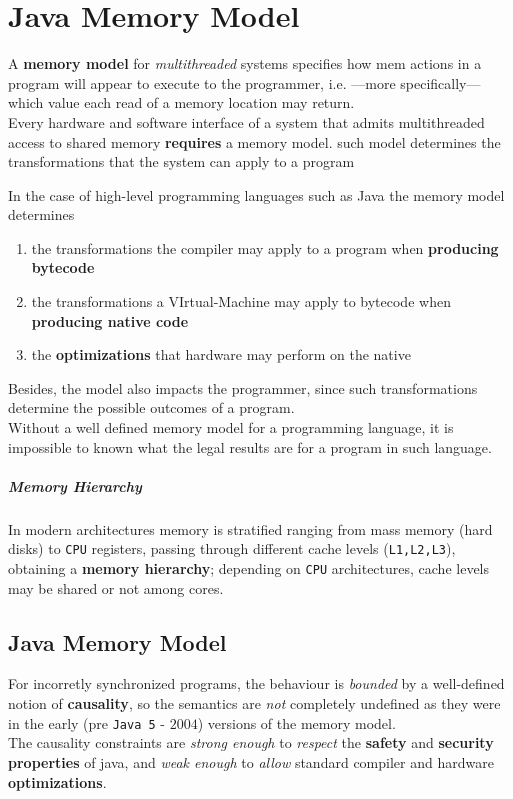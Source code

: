 \chapter{Java Memory Model}
A \textbf{memory model} for \textit{multithreaded} systems specifies how mem actions in a program will appear to execute to the programmer, i.e. {---}more specifically{---} which value each read of a memory location may return.\\
Every hardware and software interface of a system that admits multithreaded access to shared memory \textbf{requires} a memory model.
such model determines the transformations that the system can apply to a program

In the case of high-level programming languages such as Java the memory model determines
\begin{enumerate}
   \item the transformations the compiler may apply to a program when \textbf{producing bytecode}
   \item the transformations a VIrtual-Machine may apply to bytecode when \textbf{producing native code}
   \item the \textbf{optimizations} that hardware may perform on the native
\end{enumerate}
Besides, the model also impacts the programmer,
since such transformations determine the possible outcomes of a program.\\
Without a well defined memory model for a programming language, it is impossible to known what the legal results are for a program in such language.

\paragraph{Memory Hierarchy}
In modern architectures memory is stratified ranging from mass memory (hard disks) to \texttt{CPU} registers, passing through different cache levels (\texttt{L1,L2,L3}),
obtaining a \textbf{memory hierarchy};
depending on \texttt{CPU} architectures, cache levels may be shared or not among cores.

\section{Java Memory Model}
For incorretly synchronized programs, the behaviour is \textit{bounded} by a well-defined notion of \textbf{causality},
so the semantics are \textit{not} completely undefined as they were in the early (pre \texttt{Java 5} - $2004$) versions of the memory model.\\
The causality constraints are \textit{strong enough} to \textit{respect} the \textbf{safety} and \textbf{security} \textbf{properties} of java,
and \textit{weak enough} to \textit{allow} standard compiler and hardware \textbf{optimizations}.


